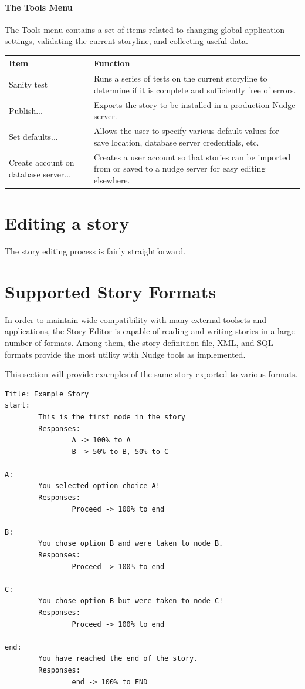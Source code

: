 \documentclass[12pt,letterpaper]{article}
\begin{document}
\paragraph{The Tools Menu}
The Tools menu contains a set of items related to changing global application settings, validating the current storyline, and collecting useful data.

\begin{center}
    \begin{tabular}{l|p{4in}}
    Item & Function\\ \hline \hline
    Sanity test & Runs a series of tests on the current storyline to determine if it is complete and sufficiently free of errors.\\ \hline
    Publish... & Exports the story to be installed in a production Nudge server.\\ \hline
    Set defaults... & Allows the user to specify various default values for save location, database server credentials, etc.\\ \hline
    Create account on database server... & Creates a user account so that stories can be imported from or saved to a nudge server for easy editing elsewhere.\\ \hline
    \end{tabular}
\end{center}

\section{Editing a story}
The story editing process is fairly straightforward. 

\section{Supported Story Formats}
In order to maintain wide compatibility with many external toolsets and applications, the Story Editor is capable of reading and writing stories in a large number of formats.
Among them, the story definitiion file, XML, and SQL formats provide the most utility with Nudge tools as implemented.

This section will provide examples of the same story exported to various formats.

\lstset{numbers=left, frame=shadowbox}
\begin{lstlisting}[breaklines=true, caption=Example story in story format.]
Title: Example Story
start:
        This is the first node in the story
        Responses:
                A -> 100% to A
                B -> 50% to B, 50% to C

A:
        You selected option choice A!
        Responses:
                Proceed -> 100% to end

B:
        You chose option B and were taken to node B.
        Responses:
                Proceed -> 100% to end

C:
        You chose option B but were taken to node C!
        Responses:
                Proceed -> 100% to end

end:
        You have reached the end of the story.
        Responses:
                end -> 100% to END
\end{lstlisting}
\end{document}
